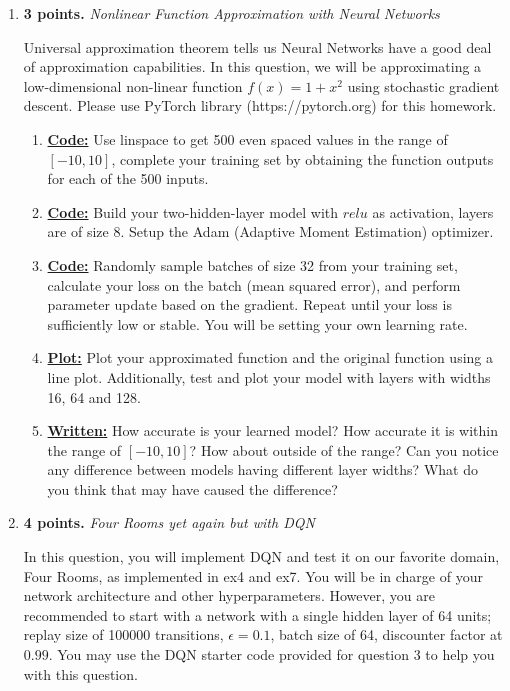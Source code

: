 \documentclass{article}
\begin{document}
\begin{enumerate}


\item \textbf{3 points.} \textit{Nonlinear Function Approximation with Neural Networks}

Universal approximation theorem tells us Neural Networks have a good deal of approximation capabilities.
In this question, we will be approximating a low-dimensional non-linear function $f(x) = 1 + x^2$ using stochastic gradient descent. Please use PyTorch library (https://pytorch.org) for this homework.

\begin{enumerate}
\item \uline{\textbf{Code:}} Use linspace to get 500 even spaced values in the range of $[-10,10]$, complete your training set by obtaining the function outputs for each of the 500 inputs. 
\item \uline{\textbf{Code:}} Build your two-hidden-layer model with $relu$ as activation, layers are of size 8. Setup the Adam (Adaptive Moment Estimation) optimizer.
\item \uline{\textbf{Code:}} Randomly sample batches of size 32 from your training set, calculate your loss on the batch (mean squared error), and perform parameter update based on the gradient. Repeat until your loss is sufficiently low or stable. You will be setting your own learning rate. 
\item \uline{\textbf{Plot:}} Plot your approximated function and the original function using a line plot. Additionally, test and plot your model with layers with widths 16, 64 and 128.
\item \uline{\textbf{Written:}} How accurate is your learned model? How accurate it is within the range of $[-10,10]$? How about outside of the range? Can you notice any difference between models having different layer widths? What do you think that may have caused the difference?
\end{enumerate}

\item \textbf{4 points.} \textit{Four Rooms yet again but with DQN}

In this question, you will implement DQN and test it on our favorite domain, Four Rooms, as implemented in ex4 and ex7.
You will be in charge of your network architecture and other hyperparameters. However, you are recommended to start with a network with a single hidden layer of 64 units; replay size of 100000 transitions, $\epsilon=0.1$, batch size of 64, discounter factor at $0.99$. You may use the DQN starter code provided for question 3 to help you with this question.


\end{enumerate}
\end{document}
